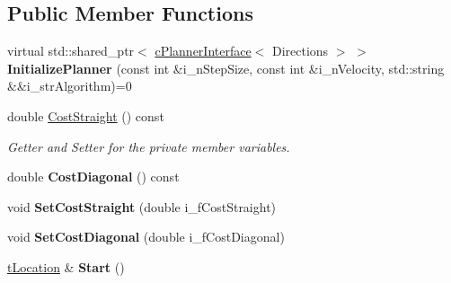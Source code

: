 \subsection*{Public Member Functions}
\begin{DoxyCompactItemize}
\item 
\mbox{\label{classplanner_1_1c_rover_interface_a7fedea18832ad850de1a2589fdca88b7}} 
virtual std\+::shared\+\_\+ptr$<$ \mbox{\hyperlink{classplanner_1_1c_planner_interface}{c\+Planner\+Interface}}$<$ Directions $>$ $>$ {\bfseries Initialize\+Planner} (const int \&i\+\_\+n\+Step\+Size, const int \&i\+\_\+n\+Velocity, std\+::string \&\&i\+\_\+str\+Algorithm)=0
\item 
\mbox{\label{classplanner_1_1c_rover_interface_ad2b552aaf43f7ce5af340d05b5657267}} 
double \mbox{\hyperlink{classplanner_1_1c_rover_interface_ad2b552aaf43f7ce5af340d05b5657267}{Cost\+Straight}} () const
\begin{DoxyCompactList}\small\item\em Getter and Setter for the private member variables. \end{DoxyCompactList}\item 
\mbox{\label{classplanner_1_1c_rover_interface_ab4c45b0f0c586f864a83ba90be06efd0}} 
double {\bfseries Cost\+Diagonal} () const
\item 
\mbox{\label{classplanner_1_1c_rover_interface_ac2f57f4b9bf2c01fbcf1ca3c6d1fc55d}} 
void {\bfseries Set\+Cost\+Straight} (double i\+\_\+f\+Cost\+Straight)
\item 
\mbox{\label{classplanner_1_1c_rover_interface_a3aa2779928912477dcf76c7767ea746d}} 
void {\bfseries Set\+Cost\+Diagonal} (double i\+\_\+f\+Cost\+Diagonal)
\item 
\mbox{\label{classplanner_1_1c_rover_interface_ad62c6dcbe7c8194c6a93ca1fc29ee4b8}} 
\mbox{\hyperlink{structplanner_1_1t_location}{t\+Location}} \& {\bfseries Start} ()
\item 
\mbox{\label{classplanner_1_1c_rover_interface_a29669ceb2b1f4cebf0953b59e3c8936a}} 

\end{DoxyCompactItemize}

